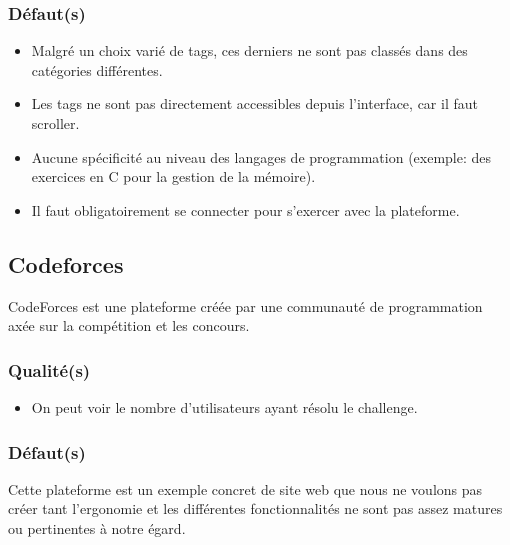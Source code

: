 \subsubsection*{Défaut(s)}

\begin{itemize}
    \item Malgré un choix varié de \glspl{tag}, ces derniers ne sont pas classés dans des catégories différentes.
    \item Les \glspl{tag} ne sont pas directement accessibles depuis l'interface, car il faut scroller.
    \item Aucune spécificité au niveau des langages de programmation (exemple: des exercices en C pour la gestion de la mémoire).
    \item Il faut obligatoirement se connecter pour s'exercer avec la plateforme.
\end{itemize}

\subsection*{Codeforces}

CodeForces est une plateforme créée par une communauté de programmation axée sur la compétition et les concours.

\subsubsection*{Qualité(s)}

\begin{itemize}
    \item On peut voir le nombre d'utilisateurs ayant résolu le challenge.
\end{itemize}

\subsubsection*{Défaut(s)}

Cette plateforme est un exemple concret de site web que nous ne voulons pas créer tant l'ergonomie et les différentes fonctionnalités ne sont pas assez matures ou pertinentes à notre égard.\\

